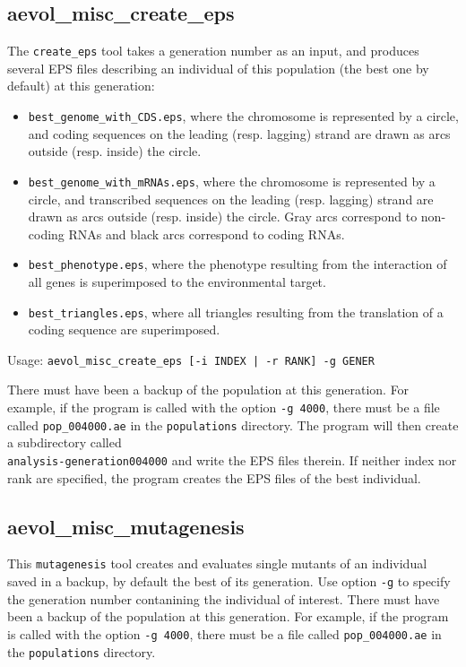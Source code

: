 \subsection{aevol\_misc\_create\_eps}
\label{sect:create-eps}
The \verb?create_eps? tool takes a generation number as an input, and produces several EPS files describing an individual of this population (the best one by default) at this generation:
\begin{itemize}
\item \verb?best_genome_with_CDS.eps?, where the chromosome is represented by a circle, and coding sequences on the leading (resp. lagging) strand are drawn as arcs outside (resp. inside) the circle.
\item \verb?best_genome_with_mRNAs.eps?, where the chromosome is represented by a circle, and transcribed sequences on the leading (resp. lagging) strand are drawn as arcs outside (resp. inside) the circle. Gray arcs correspond to non-coding RNAs and black arcs correspond to coding RNAs.
\item \verb?best_phenotype.eps?, where the phenotype resulting from the interaction of all genes is superimposed to the environmental target.
\item \verb?best_triangles.eps?, where all triangles resulting from the translation of a coding sequence are superimposed.
\end{itemize}

Usage: \verb?aevol_misc_create_eps [-i INDEX | -r RANK] -g GENER?

There must have been a backup of the population at this generation. For example, if the program is called with the option
\verb?-g 4000?, there must be a file called \verb?pop_004000.ae? in the \verb?populations? directory. The program will then create a subdirectory called \\\verb?analysis-generation004000? and write the EPS files therein. If neither index nor rank are specified, the program creates the EPS files of the best individual.


\subsection{aevol\_misc\_mutagenesis}
\label{sect:mutagenesis}

This \verb?mutagenesis? tool creates and evaluates single mutants of an individual saved in a backup,  by default the best of its generation. Use option \verb?-g? to specify the generation number contanining the individual of interest. There must have been a backup of the population at this generation. For example, if the program is called with the option
\verb?-g 4000?, there must be a file called \verb?pop_004000.ae? in the \verb?populations? directory.

